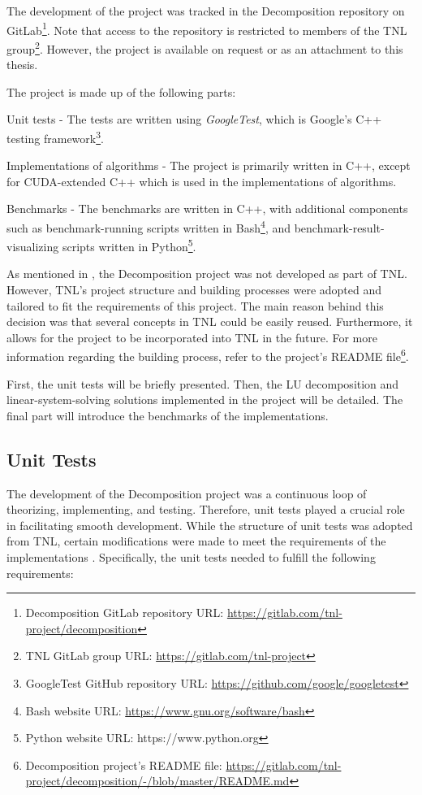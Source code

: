 The development of the project was tracked in the Decomposition repository on GitLab\footnote{Decomposition GitLab repository URL: \url{https://gitlab.com/tnl-project/decomposition}}.
Note that access to the repository is restricted to members of the TNL group\footnote{TNL GitLab group URL: \url{https://gitlab.com/tnl-project}}.
However, the project is available on request or as an attachment to this thesis.

The project is made up of the following parts:

\begin{tight_itemize}
	\item Unit tests - The tests are written using \textit{GoogleTest}, which is Google's C++ testing framework\footnote{GoogleTest GitHub repository URL: \url{https://github.com/google/googletest}}.
	\item Implementations of algorithms - The project is primarily written in C++, except for CUDA-extended C++ which is used in the implementations of algorithms.
	\item Benchmarks - The benchmarks are written in C++, with additional components such as benchmark-running scripts written in Bash\footnote{Bash website URL: \url{https://www.gnu.org/software/bash}}, and benchmark-result-visualizing scripts written in Python\footnote{Python website URL: https://www.python.org}.
\end{tight_itemize}

As mentioned in  \cite{Cejka2022}, the Decomposition project was not developed as part of TNL.
However, TNL's project structure and building processes were adopted and tailored to fit the requirements of this project.
The main reason behind this decision was that several concepts in TNL could be easily reused.
Furthermore, it allows for the project to be incorporated into TNL in the future.
For more information regarding the building process, refer to the project's README file\footnote{Decomposition project's README file: \url{https://gitlab.com/tnl-project/decomposition/-/blob/master/README.md}}.

First, the unit tests will be briefly presented.
Then, the LU decomposition and linear-system-solving solutions implemented in the project will be detailed.
The final part will introduce the benchmarks of the implementations.

\subsection{Unit Tests}\label{Subsection:implementation->decomposition-project->unit-tests}
The development of the Decomposition project was a continuous loop of theorizing, implementing, and testing.
Therefore, unit tests played a crucial role in facilitating smooth development.
While the structure of unit tests was adopted from TNL, certain modifications were made to meet the requirements of the implementations \cite{Cejka2022}.
Specifically, the unit tests needed to fulfill the following requirements:

